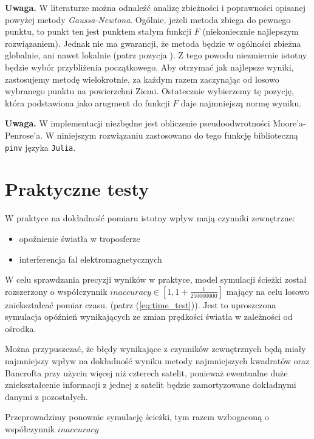 \documentclass{article}
\begin{document}
\textbf{Uwaga.} \enspace W literaturze można odnaleźć analizę zbieżności i poprawności opisanej powyżej
metody \textit{Gaussa-Newtona}. Ogólnie, jeżeli metoda zbiega do pewnego punktu, to punkt ten jest punktem stałym
funkcji $F$ (niekoniecznie najlepszym rozwiązaniem). Jednak nie ma gwarancji, że metoda będzie w ogólności zbieżna
globalnie, ani nawet lokalnie (patrz pozycja \cite{gauss_newton_convergence}). Z tego powodu niezmiernie
istotny będzie wybór przybliżenia początkowego. Aby otrzymać jak najlepsze wyniki, zastosujemy metodę wielokrotnie,
za każdym razem zaczynając od losowo wybranego punktu na powierzchni Ziemi. Ostatecznie wybierzemy tę pozycję,
która podstawiona jako arugment do funkcji $F$ daje najmniejszą normę wyniku.

\textbf{Uwaga.} \enspace W implementacji niezbędne jest obliczenie pseudoodwrotności Moore'a-Penrose'a.
W niniejszym rozwiązaniu zastosowano do tego funkcję biblioteczną \texttt{pinv} języka \texttt{Julia}.

\section{Praktyczne testy}
\par W praktyce na dokładność pomiaru istotny wpływ mają czynniki zewnętrzne:
	\begin{itemize}
		\item opoźnienie światła w troposferze
		\item interferencja fal elektromagnetycznych
	\end{itemize}
\par W celu sprawdzania precyzji wyników w praktyce, model symulacji ścieżki został rozszerzony o współczynnik $ inaccuracy \in [1, 1 + \frac{1}{250000000} ] $ mający na celu losowo zniekształcać pomiar czasu. (patrz (\ref{eq:time_test})). Jest to uproszczona symulacja opóźnień wynikających ze zmian prędkości światła w zależności od ośrodka.

\par Można przypuszczać, że błędy wynikające z czynników zewnętrznych będą miały najmniejszy wpływ na dokładność wyniku metody najmniejszych kwadratów oraz Bancrofta przy użyciu więcej niż czterech satelit, ponieważ ewentualne duże zniekształcenie informacji z jednej z satelit będzie zamortyzowane dokładnymi danymi z pozostałych.

\par Przeprowadzimy ponownie symulację ścieżki, tym razem wzbogaconą o współczynnik $inaccuracy$
\end{document}
